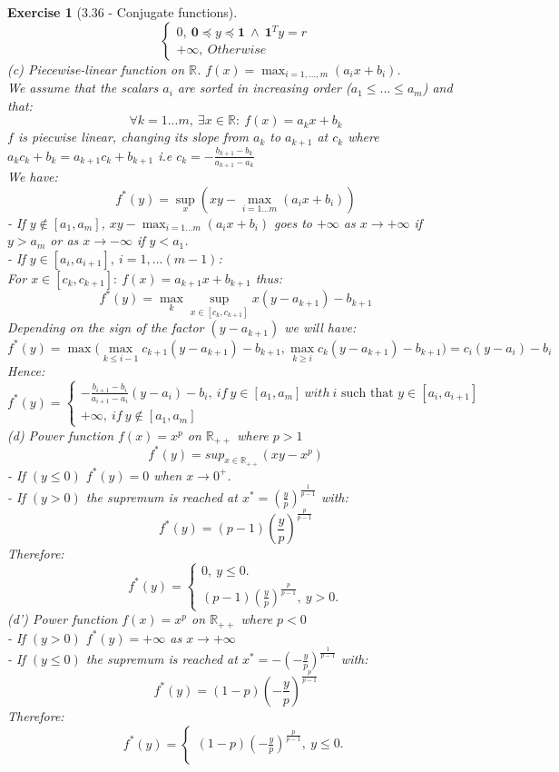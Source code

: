 \documentclass[11pt]{article}
\theoremstyle{exo}
\newtheorem*{exercise}{Exercise}
\newcommand{\R}{\mathbb{R}}
\newcommand{\1}{\mathbf{1}}
\newcommand{\0}{\mathbf{0}}
\begin{document}
\begin{exercise}[3.36 - Conjugate functions]
\[\begin{cases}
0,\:\0\preceq y\preceq \1\: \wedge\:\1^Ty=r\\
+\infty,\:Otherwise
\end{cases}\]
(c) Piecewise-linear function on $\R$. $f(x)=\max_{i=1,...,m}(a_ix+b_i)$.\\
We assume that the scalars $a_i$ are sorted in increasing order ($a_1\leq...\leq a_m$) and that:
\[\forall k=1...m,\:\exists x\in \R:\:f(x)=a_kx+b_k\]
$f$ is piecwise linear, changing its slope from $a_k$ to $a_{k+1}$ at $c_k$ where $a_kc_k+b_k=a_{k+1}c_k+b_{k+1}$ i.e $c_k=-\frac{b_{k+1}-b_k}{a_{k+1}-a_k}$\\
We have:
\[f^*(y)=\sup_x(xy-\max_{i=1...m}(a_ix+b_i))\]
- If $y\not\in[a_1,a_m]$, $xy-\max_{i=1...m}(a_ix+b_i)$ goes to $+\infty$ as $x\to+\infty$ if $y>a_m$ or as $x\to-\infty$ if $y<a_1$.\\
- If $y\in [a_i,a_{i+1}],\:i=1,...(m-1)$:\\
For $x\in[c_k,c_{k+1}]:\:f(x)=a_{k+1}x+b_{k+1}$ thus:
\[f^*(y)=\max_k\sup_{x\in[c_k,c_{k+1}]}x(y-a_{k+1})-b_{k+1}\]
Depending on the sign of the factor $(y-a_{k+1})$ we will have:
\[f^*(y)=\max\big(\max_{k\leq i-1}c_{k+1}(y-a_{k+1})-b_{k+1},\max_{k\geq i}c_k(y-a_{k+1})-b_{k+1}\big)=c_i(y-a_i)-b_i\]
Hence:
\[f^*(y)=\begin{cases}
-\frac{b_{i+1}-b_i}{a_{i+1}-a_i}(y-a_i)-b_i,\:if\:y\in[a_1,a_m]\:with\:i\text{ such that }y\in[a_i,a_{i+1}]\\
+\infty,\:if\:y\not\in[a_1,a_m]
\end{cases}
\]
(d) Power function $f(x)=x^p$ on $\R_{++}$ where $p>1$\\
\[f^*(y)=sup_{x\in\R_{++}}(xy-x^p)\]
- If $(y\leq 0)$ $f^*(y)=0$ when $x\to 0^+$.\\
- If $(y>0)$ the supremum is reached at $x^*=\left(\frac{y}{p}\right)^{\frac{1}{p-1}}$ with:
\[f^*(y)=(p-1)\left(\frac{y}{p}\right)^{\frac{p}{p-1}}\]
Therefore:
\[f^*(y)=\begin{cases}
0,\:y\leq 0.\\
(p-1)\left(\frac{y}{p}\right)^{\frac{p}{p-1}},\:y>0.
\end{cases}
\]
(d') Power function $f(x)=x^p$ on $\R_{++}$ where $p<0$\\
- If $(y>0)$ $f^*(y)=+\infty$ as $x\to+\infty$\\
- If $(y\leq 0)$ the supremum is reached at $x^*=-\left(-\frac{y}{p}\right)^{\frac{1}{p-1}}$ with:
\[f^*(y)=(1-p)\left(-\frac{y}{p}\right)^{\frac{p}{p-1}}\]
Therefore:
\[f^*(y)=\begin{cases}
(1-p)\left(-\frac{y}{p}\right)^{\frac{p}{p-1}},\:y\leq0.\\

\end{cases}\]
\end{exercise}
\end{document}
